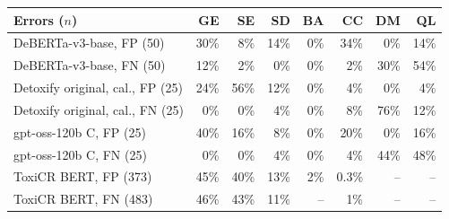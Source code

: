 \begin{tabular}{lrrrrrrr}
\toprule
Errors ($n$) & GE & SE & SD & BA & CC & DM & QL \\
\midrule
DeBERTa-v3-base, FP (50) & 30\% & 8\% & 14\% & 0\% & 34\% & 0\% & 14\% \\
DeBERTa-v3-base, FN (50) & 12\% & 2\% & 0\% & 0\% & 2\% & 30\% & 54\% \\
Detoxify original, cal., FP (25) & 24\% & 56\% & 12\% & 0\% & 4\% & 0\% & 4\% \\
Detoxify original, cal., FN (25) & 0\% & 0\% & 4\% & 0\% & 8\% & 76\% & 12\% \\
gpt-oss-120b C, FP (25) & 40\% & 16\% & 8\% & 0\% & 20\% & 0\% & 16\% \\
gpt-oss-120b C, FN (25) & 0\% & 0\% & 4\% & 0\% & 4\% & 44\% & 48\% \\
\midrule
ToxiCR BERT, FP (373) & 45\% & 40\% & 13\% & 2\% & 0.3\% & -- & -- \\
ToxiCR BERT, FN (483) & 46\% & 43\% & 11\% & -- & 1\% & -- & -- \\
\bottomrule
\end{tabular}
